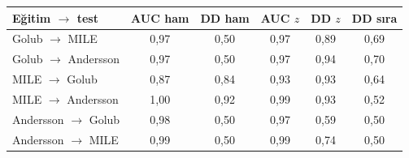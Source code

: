 \begin{tabular}{@{}lccccc@{}}
\toprule
Eğitim $\to$ test & AUC ham & DD ham & AUC $z$ & DD $z$ & DD sıra\\ \midrule
Golub $\to$ MILE & 0{,}97 & 0{,}50 & 0{,}97 & 0{,}89 & 0{,}69\\
Golub $\to$ Andersson & 0{,}97 & 0{,}50 & 0{,}97 & 0{,}94 & 0{,}70\\
MILE $\to$ Golub & 0{,}87 & 0{,}84 & 0{,}93 & 0{,}93 & 0{,}64\\
MILE $\to$ Andersson & 1{,}00 & 0{,}92 & 0{,}99 & 0{,}93 & 0{,}52\\
Andersson $\to$ Golub & 0{,}98 & 0{,}50 & 0{,}97 & 0{,}59 & 0{,}50\\
Andersson $\to$ MILE & 0{,}99 & 0{,}50 & 0{,}99 & 0{,}74 & 0{,}50\\
\bottomrule
\end{tabular}
